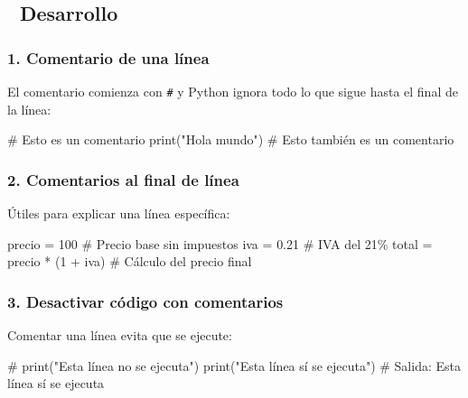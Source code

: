 \documentclass[
  doc,
  floatsintext,
  longtable,
  a4paper,
  nolmodern,
  notxfonts,
  notimes,
  12pt,
  colorlinks=true,linkcolor=blue,citecolor=blue,urlcolor=blue]{apa7}
\newenvironment{Shaded}{\begin{snugshade}}{\end{snugshade}}
\newcommand{\BuiltInTok}[1]{\textcolor[rgb]{0.00,0.23,0.31}{#1}}
\newcommand{\CommentTok}[1]{\textcolor[rgb]{0.37,0.37,0.37}{#1}}
\newcommand{\DecValTok}[1]{\textcolor[rgb]{0.68,0.00,0.00}{#1}}
\newcommand{\FloatTok}[1]{\textcolor[rgb]{0.68,0.00,0.00}{#1}}
\newcommand{\NormalTok}[1]{\textcolor[rgb]{0.00,0.23,0.31}{#1}}
\newcommand{\OperatorTok}[1]{\textcolor[rgb]{0.37,0.37,0.37}{#1}}
\newcommand{\StringTok}[1]{\textcolor[rgb]{0.13,0.47,0.30}{#1}}
\begin{document}
\subsection{📐 Desarrollo}\label{desarrollo}

\subsubsection{1. Comentario de una
línea}\label{comentario-de-una-luxednea}

El comentario comienza con \texttt{\#} y Python ignora todo lo que sigue
hasta el final de la línea:

\begin{Shaded}
\begin{Highlighting}[]
\CommentTok{\# Esto es un comentario}
\BuiltInTok{print}\NormalTok{(}\StringTok{"Hola mundo"}\NormalTok{)  }\CommentTok{\# Esto también es un comentario}
\end{Highlighting}
\end{Shaded}

\subsubsection{2. Comentarios al final de
línea}\label{comentarios-al-final-de-luxednea}

Útiles para explicar una línea específica:

\begin{Shaded}
\begin{Highlighting}[]
\NormalTok{precio }\OperatorTok{=} \DecValTok{100}      \CommentTok{\# Precio base sin impuestos}
\NormalTok{iva }\OperatorTok{=} \FloatTok{0.21}        \CommentTok{\# IVA del 21\%}
\NormalTok{total }\OperatorTok{=}\NormalTok{ precio }\OperatorTok{*}\NormalTok{ (}\DecValTok{1} \OperatorTok{+}\NormalTok{ iva)  }\CommentTok{\# Cálculo del precio final}
\end{Highlighting}
\end{Shaded}

\subsubsection{3. Desactivar código con
comentarios}\label{desactivar-cuxf3digo-con-comentarios}

Comentar una línea evita que se ejecute:

\begin{Shaded}
\begin{Highlighting}[]
\CommentTok{\# print("Esta línea no se ejecuta")}
\BuiltInTok{print}\NormalTok{(}\StringTok{"Esta línea sí se ejecuta"}\NormalTok{)}
\CommentTok{\# Salida: Esta línea sí se ejecuta}
\end{Highlighting}
\end{Shaded}
\end{document}
